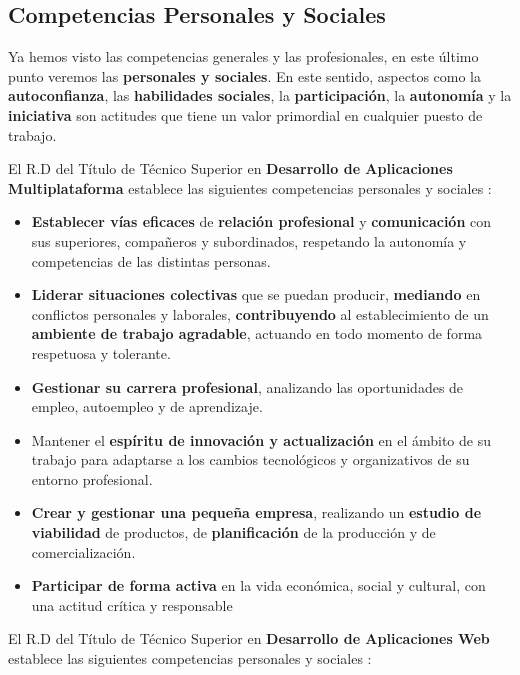 \subsection{Competencias Personales y Sociales}
Ya hemos visto las competencias generales y las profesionales, en este último punto veremos las \textbf{personales y sociales}. En este sentido, aspectos como la \textbf{autoconfianza}, las \textbf{habilidades sociales}, la \textbf{participación}, la \textbf{autonomía} y la \textbf{iniciativa} son actitudes que tiene un valor primordial en cualquier puesto de trabajo.

El R.D del Título de Técnico Superior en \textbf{Desarrollo de Aplicaciones Multiplataforma} establece las siguientes competencias personales y sociales \cite{rd686}:

\begin{itemize}
    \item \textbf{Establecer vías eficaces} de \textbf{relación profesional} y \textbf{comunicación} con sus superiores, compañeros y subordinados, respetando la autonomía y competencias de las distintas personas.
    \item \textbf{Liderar  situaciones  colectivas}  que  se  puedan  producir, \textbf{mediando} en conflictos personales  y  laborales,  \textbf{contribuyendo}  al  establecimiento  de  un  \textbf{ambiente  de  trabajo agradable}, actuando en todo momento de forma respetuosa y tolerante.
    \item \textbf{Gestionar su carrera profesional}, analizando las oportunidades de empleo, autoempleo y de aprendizaje.
    \item Mantener el \textbf{espíritu de innovación y actualización} en el ámbito de su trabajo para adaptarse a los cambios tecnológicos y organizativos de su entorno profesional.
    \item \textbf{Crear y gestionar una pequeña empresa}, realizando un \textbf{estudio de viabilidad} de productos, de \textbf{planificación} de la producción y de comercialización.
    \item \textbf{Participar de forma activa} en la vida económica, social y cultural, con una actitud crítica y responsable
\end{itemize}

El R.D del Título de Técnico Superior en \textbf{Desarrollo de Aplicaciones Web} establece las siguientes competencias personales y sociales \cite{rd450}:

